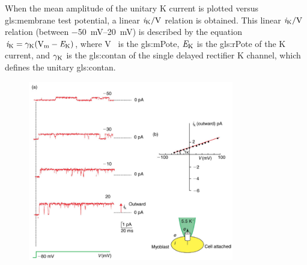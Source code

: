 \documentclass[class={myRUCProject}, crop=false]{standalone}
\begin{document}
When the mean amplitude of the unitary \gls{K} current is plotted versus \gls{gls:membrane} test potential, a linear \(\ucur\potassium/\unit{\V}\) relation is obtained. This linear \(\ucur\potassium/\unit{\V}\) relation (between \qtyrange{-50}{20}{\mV}) is described by the equation \(\ucur\potassium = \ucon\potassium(\unit{\V\membrane}-\equi\potassium)\), where \unit{\V\membrane} is the \gls{gls:mPote}, \(\mathit{E}_\mathrm{K}\) is the \gls{gls:rPote} of the \gls{K} current, and \(\gamma_\mathrm{K}\) is the \gls{gls:contan} of the single delayed rectifier \gls{K} channel, which defines the unitary \gls{gls:contan}. 


\begin{figure}[H]
   \centering
   \includegraphics[width=0.8\textwidth]{Pictures//Anakin/I-V.K.png}
   \caption{}\label{fig:rangeThree}
 \end{figure} 
\end{document}
